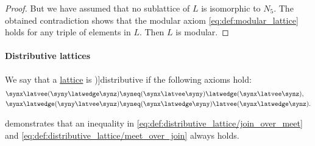 \begin{proof}
  But we have assumed that no sublattice of \( L \) is isomorphic to \( N_5 \). The obtained contradiction shows that the modular axiom \eqref{eq:def:modular_lattice} holds for any triple of elements in \( L \). Then \( L \) is modular.
\end{proof}

\paragraph{Distributive lattices}

\begin{definition}\label{def:distributive_lattice}
  We say that a \hyperref[def:lattice]{lattice} is \term[ru=дистрибутивная (решётка) (\cite[def. 4.7]{Гуров2013ТеорияРешёток})]{distributive} if the following axioms hold:
  \begin{align}
    \synx \latvee (\syny \latwedge \synz) &\syneq (\synx \latvee \syny) \latwedge (\synx \latvee \synz), \label{eq:def:distributive_lattice/join_over_meet} \\
    \synx \latwedge (\syny \latvee \synz) &\syneq (\synx \latwedge \syny) \latvee (\synx \latwedge \synz). \label{eq:def:distributive_lattice/meet_over_join}
  \end{align}
\end{definition}
\begin{comments}
  \item {} demonstrates that an inequality in \eqref{eq:def:distributive_lattice/join_over_meet} and \eqref{eq:def:distributive_lattice/meet_over_join} always holds.
\end{comments}

